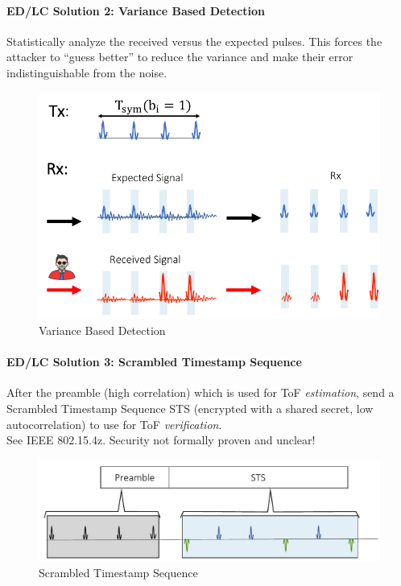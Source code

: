 \paragraph{ED/LC Solution 2: Variance Based Detection}
Statistically analyze the received versus the expected pulses.
This forces the attacker to ``guess better'' to reduce the variance and make their error indistinguishable from the noise.

\begin{figure}[h]
	\centering
	\includegraphics[scale=0.4]{images/5-variance-based.png}
	\caption{Variance Based Detection}%
	\label{fig:variance-based}
\end{figure}

\paragraph{ED/LC Solution 3: Scrambled Timestamp Sequence}

After the preamble (high correlation) which is used for ToF \textit{estimation},
send a Scrambled Timestamp Sequence STS (encrypted with a shared secret, low autocorrelation) to use for ToF \textit{verification}.
\\
See IEEE 802.15.4z.
Security not formally proven and unclear!

\begin{figure}[h]
	\centering
	\includegraphics[scale=0.35]{images/5-scrambled-timestamp.png}
	\caption{Scrambled Timestamp Sequence}%
	\label{fig:scrambled-timestamp}
\end{figure}

